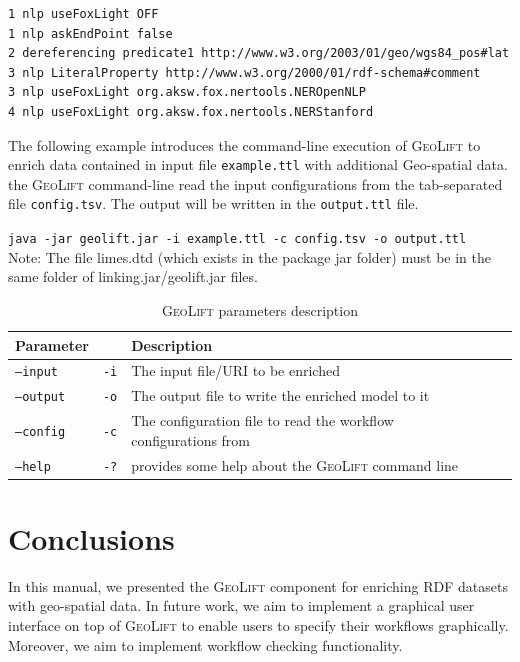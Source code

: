 \documentclass[a4paper,twoside,bibtotoc,abstracton,12pt,BCOR=15mm]{article}
\newcommand{\geolift}{\textsc{GeoLift}\xspace}
\begin{document}
\begin{lstlisting}[label=lst:geoliftConfig, caption =\geolift configuration file example class.]
1 nlp useFoxLight OFF
1 nlp askEndPoint false
2 dereferencing predicate1 http://www.w3.org/2003/01/geo/wgs84_pos#lat
3 nlp LiteralProperty http://www.w3.org/2000/01/rdf-schema#comment
3 nlp useFoxLight org.aksw.fox.nertools.NEROpenNLP
4 nlp useFoxLight org.aksw.fox.nertools.NERStanford
\end{lstlisting}

The following example introduces the command-line execution of \geolift to enrich data contained in input file \texttt{example.ttl} with additional Geo-spatial data.
the \geolift command-line read the input configurations from the tab-separated file \texttt{config.tsv}.
The output will be written in the \texttt{output.ttl} file.

{\flushleft\texttt{java -jar geolift.jar -i example.ttl -c config.tsv -o output.ttl}}
\newline
\\Note: The file limes.dtd (which exists in the package jar folder) must be in the same folder of linking.jar/geolift.jar files.
\begin{table}[ht]
\caption{\geolift parameters description} \label{tbl:geoLiftPram}
\begin{tabular}{@{}  l  l p{10.5cm} l p{}@{}}
\toprule
\textbf{Parameter} 	& \textbf{}	& \textbf{Description}\\
\midrule
\texttt{--input} 	&\texttt{-i}	& The input file/URI to be enriched\\
\texttt{--output} 	&\texttt{-o} 	& The output file to write the enriched model to it\\
\texttt{--config} 	&\texttt{-c} 	& The configuration file to read the workflow configurations from\\
\texttt{--help}		&\texttt{-?} 	& provides some help about the \geolift command line \\
\bottomrule
\end{tabular}
\end{table}



\section{Conclusions}
In this manual, we presented the \geolift component for enriching RDF datasets with geo-spatial data.
In future work, we aim to implement a graphical user interface on top of \geolift to enable users to specify their workflows graphically.
Moreover, we aim to implement workflow checking functionality.



\end{document}
